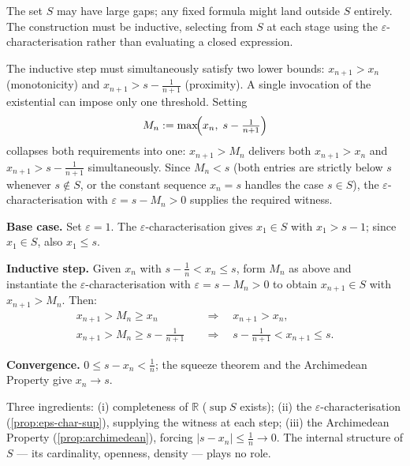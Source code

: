 \begin{remark}
The set $S$ may have large gaps; any fixed formula might land outside $S$
entirely. The construction must be inductive, selecting from $S$ at each
stage using the $\varepsilon$-characterisation rather than evaluating a
closed expression.
\end{remark}

\begin{remark}
The inductive step must simultaneously satisfy two lower bounds:
$x_{n+1}>x_n$ (monotonicity) and $x_{n+1}>s-\tfrac{1}{n+1}$ (proximity).
A single invocation of the existential can impose only one threshold. Setting
\[
  M_n:=\max\!\Bigl(x_n,\;s-\tfrac{1}{n+1}\Bigr)
\]
collapses both requirements into one: $x_{n+1}>M_n$ delivers both
$x_{n+1}>x_n$ and $x_{n+1}>s-\tfrac{1}{n+1}$ simultaneously. Since
$M_n<s$ (both entries are strictly below $s$ whenever $s\notin S$, or
the constant sequence $x_n=s$ handles the case $s\in S$), the
$\varepsilon$-characterisation with $\varepsilon=s-M_n>0$ supplies the
required witness.

\medskip
\noindent\textbf{Base case.} Set $\varepsilon=1$. The
$\varepsilon$-characterisation gives $x_1\in S$ with $x_1>s-1$; since
$x_1\in S$, also $x_1\leq s$.

\noindent\textbf{Inductive step.} Given $x_n$ with
$s-\tfrac{1}{n}<x_n\leq s$, form $M_n$ as above and instantiate the
$\varepsilon$-characterisation with $\varepsilon=s-M_n>0$ to obtain
$x_{n+1}\in S$ with $x_{n+1}>M_n$. Then:
\begin{align*}
  x_{n+1}>M_n\geq x_n
    &\quad\Rightarrow\quad x_{n+1}>x_n, \\
  x_{n+1}>M_n\geq s-\tfrac{1}{n+1}
    &\quad\Rightarrow\quad s-\tfrac{1}{n+1}<x_{n+1}\leq s.
\end{align*}

\noindent\textbf{Convergence.} $0\leq s-x_n<\tfrac{1}{n}$; the squeeze
theorem and the Archimedean Property give $x_n\to s$.
\end{remark}

\begin{remark}
Three ingredients: (i) completeness of $\mathbb{R}$ ($\sup S$ exists);
(ii) the $\varepsilon$-characterisation (\cref{prop:eps-char-sup}), supplying
the witness at each step; (iii) the Archimedean Property
(\cref{prop:archimedean}), forcing $|s-x_n|\leq\tfrac{1}{n}\to 0$.
The internal structure of $S$ — its cardinality, openness, density —
plays no role.
\end{remark}

